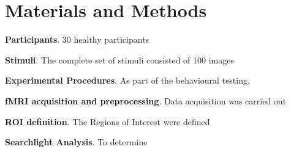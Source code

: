 

\section*{Materials and Methods}
\textbf{Participants}. 30 healthy participants \lipsum[4]

\vspace{5mm} %

\noindent\textbf{Stimuli}. The complete set of stimuli consisted of 100 images \lipsum[5-6]

\vspace{5mm} %

\noindent\textbf{Experimental Procedures}. As part of the behavioural testing, \lipsum[6-8]

\vspace{5mm} %

\noindent\textbf{fMRI acquisition and preprocessing}. Data acquisition was carried out \lipsum[5] \cite{hung2005fast} \lipsum[5]

\vspace{5mm} %

\noindent\textbf{ROI definition}. The Regions of Interest were defined \lipsum[4] \cite{hung2005fast, kourtzi2011neural} \lipsum[5-6]

\vspace{5mm} %

\noindent\textbf{Searchlight Analysis}. To determine \lipsum[4-6] 








